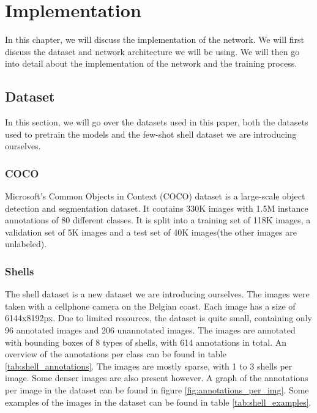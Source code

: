  
\chapter{Implementation}
In this chapter, we will discuss the implementation of the network. We will first discuss the dataset and network architecture we will be using. We will then go into detail about the implementation of the network and the training process. 

\section{Dataset}
In this section, we will go over the datasets used in this paper, both the datasets used to pretrain the models and the few-shot shell dataset we are introducing ourselves.

\subsection{COCO}

Microsoft's Common Objects in Context (COCO) dataset is a large-scale object detection and segmentation dataset. It contains 330K images with 1.5M instance annotations of 80 different classes. It is split into a training set of 118K images, a validation set of 5K images and a test set of 40K images(the other images are unlabeled). \citet{COCO}

\subsection{Shells}

The shell dataset is a new dataset we are introducing ourselves. The images were taken with a cellphone camera on the Belgian coast. Each image has a size of 6144x8192px. Due to limited resources, the dataset is quite small, containing only 96 annotated images and 206 unannotated images. The images are annotated with bounding boxes of 8 types of shells, with 614 annotations in total. An overview of the annotations per class can be found in table \ref{tab:shell_annotations}. The images are mostly sparse, with 1 to 3 shells per image. Some denser images are also present however. A graph of the annotations per image in the dataset can be found in figure \ref{fig:annotations_per_img}. Some examples of the images in the dataset can be found in table \ref{tab:shell_examples}.

